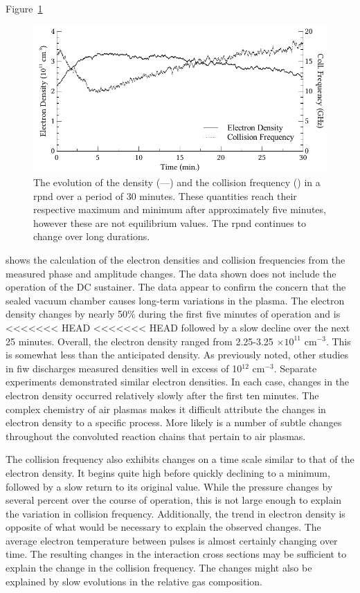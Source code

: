 Figure~\ref{fig:densev}
\begin{figure}
  \centering
  \includegraphics{./chapters/nasa/figures/densev.pdf}
  \caption{The evolution of the density (---) and the collision frequency
    (\raisebox{2.5pt}{${\scriptscriptstyle \centerdot \centerdot \centerdot}$}) in
    a \acs{rpnd} over a period of 30 minutes. These quantities reach their
    respective maximum and minimum after approximately five minutes, however these
    are not equilibrium values. The \acs{rpnd} continues to change over long
    durations.}
  \label{fig:densev}
\end{figure}
shows the calculation of the electron densities and collision frequencies from
the measured phase and amplitude changes. The data shown does not include the
operation of the DC sustainer. The data appear to confirm the concern that the
sealed vacuum chamber causes long-term variations in the plasma. The electron
density changes by nearly 50\% during the first five minutes of operation and is
<<<<<<< HEAD
<<<<<<< HEAD
followed by a slow decline over the next 25 minutes. Overall, the electron
density ranged from 2.25-3.25 $\times10^{11}$ cm$^{-3}$. This is somewhat less
than the anticipated density. As previously noted, other studies in \acs{fiw}
discharges \cite{Aleksandrov2007, Pancheshnyi1999, Macheret2006} measured
densities well in excess of 10$^{12}$ cm$^{-3}$. Separate experiments
demonstrated similar electron densities. In each case, changes in the electron
density occurred relatively slowly after the first ten minutes. The complex
chemistry of air plasmas makes it difficult attribute the changes in electron
density to a specific process. More likely is a number of subtle changes
throughout the convoluted reaction chains that pertain to air plasmas.

The collision frequency also exhibits changes on a time scale similar to that of
the electron density. It begins quite high before quickly declining to a
minimum, followed by a slow return to its original value. While the pressure
changes by several percent over the course of operation, this is not large
enough to explain the variation in collision frequency. Additionally, the trend
in electron density is opposite of what would be necessary to explain the
observed changes. The average electron temperature between pulses is almost
certainly changing over time. The resulting changes in the interaction cross
sections may be sufficient to explain the change in the collision frequency.
The changes might also be explained by slow evolutions in the relative gas
composition.

